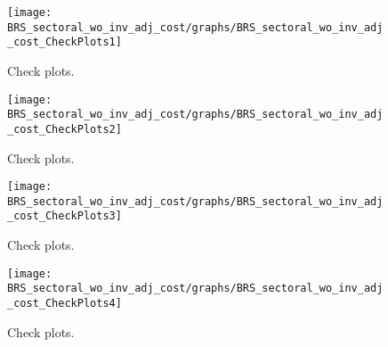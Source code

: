  
\begin{figure}[H]
\centering 
\texttt{[image: BRS\_sectoral\_wo\_inv\_adj\_cost/graphs/BRS\_sectoral\_wo\_inv\_adj\_cost\_CheckPlots1]}
\caption{Check plots.}\label{Fig:CheckPlots:1}
\end{figure}
 
\begin{figure}[H]
\centering 
\texttt{[image: BRS\_sectoral\_wo\_inv\_adj\_cost/graphs/BRS\_sectoral\_wo\_inv\_adj\_cost\_CheckPlots2]}
\caption{Check plots.}\label{Fig:CheckPlots:2}
\end{figure}
 
\begin{figure}[H]
\centering 
\texttt{[image: BRS\_sectoral\_wo\_inv\_adj\_cost/graphs/BRS\_sectoral\_wo\_inv\_adj\_cost\_CheckPlots3]}
\caption{Check plots.}\label{Fig:CheckPlots:3}
\end{figure}
 
\begin{figure}[H]
\centering 
\texttt{[image: BRS\_sectoral\_wo\_inv\_adj\_cost/graphs/BRS\_sectoral\_wo\_inv\_adj\_cost\_CheckPlots4]}
\caption{Check plots.}\label{Fig:CheckPlots:4}
\end{figure}
 
